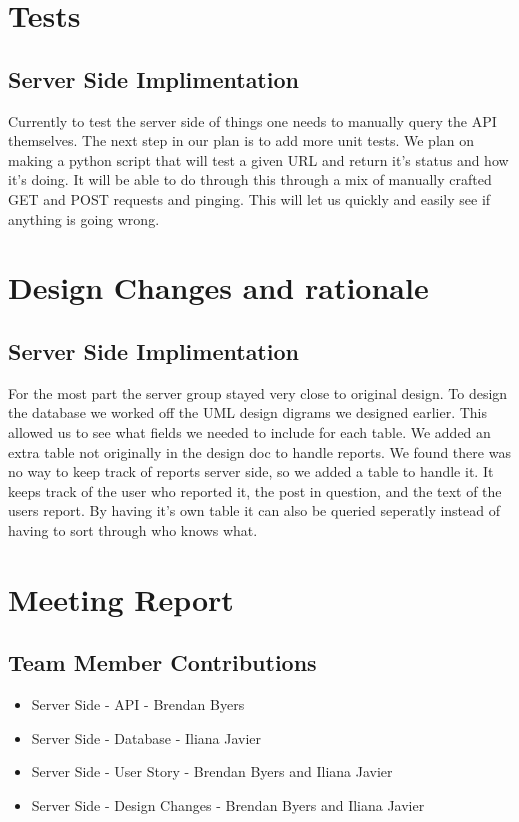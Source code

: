 \documentclass[12pt]{article}
\begin{document}
\section{Tests}
\subsection{Server Side Implimentation}
Currently to test the server side of things one needs to manually query the API themselves.  The next step in our plan is to add more unit tests.  We plan on making a python script that will test a given URL and return it's status and how it's doing.  It will be able to do through this through a mix of manually crafted GET and POST requests and pinging.  This will let us quickly and easily see if anything is going wrong.
\section{Design Changes and rationale}
\subsection{Server Side Implimentation}
For the most part the server group stayed very close to original design.  To design the database we worked off the UML design digrams we designed earlier.  This allowed us to see what fields we needed to include for each table.  We added an extra table not originally in the design doc to handle reports.  We found there was no way to keep track of reports server side, so we added a table to handle it.  It keeps track of the user who reported it, the post in question, and the text of the users report.  By having it's own table it can also be queried seperatly instead of having to sort through who knows what.
\section{Meeting Report}

\subsection{Team Member Contributions}
\begin{itemize}
      \item Server Side - API - Brendan Byers
      \item Server Side - Database - Iliana Javier
      \item Server Side - User Story - Brendan Byers and Iliana Javier
      \item Server Side - Design Changes - Brendan Byers and Iliana Javier
\end{itemize}
\end{document}
